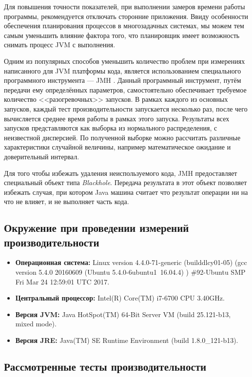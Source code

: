 Для повышения точности показателей, при выполнении замеров времени работы программы, рекомендуется отключать сторонние приложения. Ввиду особенности обеспечения планирования процессов в многозадачных системах, мы можем тем самым уменьшить влияние фактора того, что планировщик имеет возможность снимать процесс JVM с выполнения.

Одним из популярных способов уменьшить количество проблем при измерениях написанного для JVM платформы кода, является использованием специального программного инструмента --- JMH \cite{java:jmh}. Данный программный инструмент, путём передачи ему определённых параметров, самостоятельно обеспечивает требуемое количество <<разогревочных>> запусков. В рамках каждого из основных запусков, каждый тест производительности запускается несколько раз, после чего вычисляется среднее время работы в рамках этого запуска. Результаты всех запусков представляются как выборка из нормального распределения, с неизвестной дисперсией. По полученной выборке можно рассчитать различные характеристики случайной величины, например математическое ожидание и доверительный интервал.

    Для того чтобы избежать удаления неиспользуемого кода, JMH предоставляет специальный объект типа \textit{Blackhole}. Передача результата в этот объект позволяет избежать случая, при котором Java машина считает что результат операции ни на что не влияет, и не выполняет часть кода.

\subsection{Окружение при проведении измерений производительности}

\begin{itemize}
    \item \textbf{Операционная система:} Linux version 4.4.0-71-generic (buildd\at lcy01-05) (gcc version 5.4.0 20160609 (Ubuntu 5.4.0-6ubuntu1~16.04.4) ) \#92-Ubuntu SMP Fri Mar 24 12:59:01 UTC 2017.
    \item \textbf{Центральный процессор:}  Intel(R) Core(TM) i7-6700 CPU \at 3.40GHz.
    \item \textbf{Версия JVM:}  Java HotSpot(TM) 64-Bit Server VM (build 25.121-b13, mixed mode).
    \item \textbf{Версия JRE:}  Java(TM) SE Runtime Environment (build 1.8.0\_121-b13).
\end{itemize}


\subsection{Рассмотренные тесты производительности}

